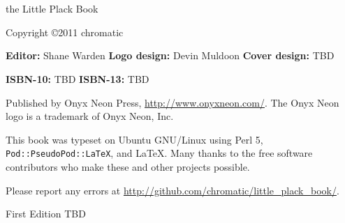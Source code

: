 \chapter*{}
\thispagestyle{empty}

\huge{the Little Plack Book}
\newline
\newline
\normalsize

Copyright \copyright\mbox{}2011 chromatic

\vfill
\textbf{Editor:} Shane Warden\newline
\textbf{Logo design:} Devin Muldoon\newline
\textbf{Cover design:} TBD

\textbf{ISBN-10:} TBD\newline
\textbf{ISBN-13:} TBD

Published by Onyx Neon Press, \url{http://www.onyxneon.com/}.
The Onyx Neon logo is a trademark of Onyx Neon, Inc.

This book was typeset on Ubuntu GNU/Linux using Perl 5,
\textnhtt{Pod::PseudoPod::LaTeX}, and LaTeX. Many thanks to the free software
contributors who make these and other projects possible.

Please report any errors at
\url{http://github.com/chromatic/little_plack_book/}.

First Edition TBD

\pagebreak
%

